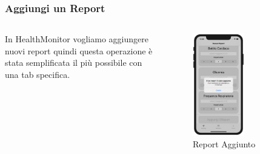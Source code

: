 \documentclass{beamer}
\begin{document}
\begin{frame}
\frametitle{Aggiungi un Report}
\begin{columns}
In HealthMonitor vogliamo aggiungere nuovi report quindi questa operazione è stata semplificata il più possibile con una tab specifica.
  \centering  
  \begin{figure}[h]
        \includegraphics[width=0.55\textwidth]{../img/nuovo2.png}
        \caption{Report Aggiunto}
   \end{figure}
\end{columns}
\end{frame}
\end{document}

